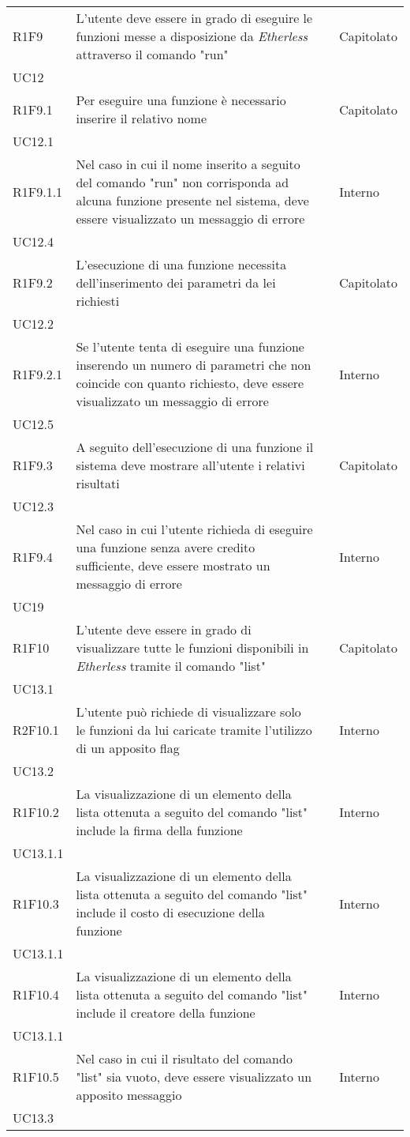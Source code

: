 \begin{longtable}{ 
		>{\centering}p{} 
		>{}p{} 
		>{\centering}p{}
		>{\centering}p{} }
	R1F9 & L'utente deve essere in grado di eseguire le funzioni messe a 
		disposizione da \textit{Etherless} attraverso il comando "run" 				& \ob & Capitolato \\ UC12 \tabularnewline
	R1F9.1 & Per eseguire una funzione è necessario inserire il relativo nome 		& \ob & Capitolato \\ UC12.1 \tabularnewline
	R1F9.1.1 & Nel caso in cui il nome inserito a seguito del comando "run" non 
		corrisponda ad alcuna funzione presente nel sistema, deve essere 
		visualizzato un messaggio di errore											& \ob & Interno \\ UC12.4 \tabularnewline 
	R1F9.2 & L'esecuzione di una funzione necessita dell'inserimento dei parametri 
		da lei richiesti 															& \ob & Capitolato \\ UC12.2 \tabularnewline
	R1F9.2.1 & Se l'utente tenta di eseguire una funzione inserendo un numero 
		di parametri che non coincide con quanto richiesto, deve essere 
		visualizzato un messaggio di errore 										& \ob & Interno \\ UC12.5 \tabularnewline
	R1F9.3 & A seguito dell'esecuzione di una funzione il sistema deve mostrare 
		all'utente i relativi risultati 											& \ob & Capitolato \\ UC12.3 \tabularnewline
	R1F9.4 & Nel caso in cui l'utente richieda di eseguire una funzione senza 
		avere credito sufficiente, deve essere mostrato un messaggio di errore		& \ob & Interno \\ UC19 \tabularnewline
	
	R1F10 & L'utente deve essere in grado di visualizzare tutte le funzioni 
		disponibili in \textit{Etherless} tramite il comando "list" 				& \ob & Capitolato \\ UC13.1 \tabularnewline
	R2F10.1 & L'utente può richiede di visualizzare solo le funzioni da 
		lui caricate tramite l'utilizzo di un apposito flag 						& \de & Interno \\ UC13.2 \tabularnewline
	R1F10.2 & La visualizzazione di un elemento della lista ottenuta a seguito 
		del comando "list" include la firma della funzione 							& \ob & Interno \\ UC13.1.1 \tabularnewline
	R1F10.3 & La visualizzazione di un elemento della lista ottenuta a seguito 
		del comando "list" include il costo di esecuzione della funzione 			& \ob & Interno \\ UC13.1.1 \tabularnewline
	R1F10.4 & La visualizzazione di un elemento della lista ottenuta a seguito 
		del comando "list" include il creatore della funzione 						& \ob & Interno \\ UC13.1.1 \tabularnewline
	R1F10.5 & Nel caso in cui il risultato del comando "list" sia vuoto, deve 
		essere visualizzato un apposito messaggio 									& \ob & Interno \\ UC13.3 \tabularnewline
	

\end{longtable}
